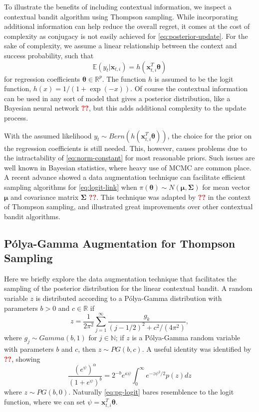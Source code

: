 \documentclass[12pt]{article}
\newcommand{\bred}[1]{\textbf{\textcolor{red}{#1}}}
\begin{document}
To illustrate the benefits of including contextual information, we inspect a 
contextual bandit algorithm using Thompson sampling.
While incorporating additional information can help reduce the overall regret, 
it comes at the cost of complexity as conjugacy is not easily achieved for 
\eqref{eq:posterior-update}.
For the sake of complexity, we assume a linear relationship between the context 
and success probability, such that
\begin{equation}
\mathbb{E}(y_t \vert \bm{x}_{t,i}) = h(\bm{x}_{t,i}^T \bm{\theta})
\label{eq:logit-link}
\end{equation}
for regression coefficients $\bm{\theta} \in \mathbb{R}^p$. 
The function $h$ is assumed to be the logit function, 
$h(x) = 1 / (1 + \exp(-x))$.
Of course the contextual information can be used in any sort of model that gives a
posterior distribution, like a Bayesian neural network \bred{??}, but this adds 
additional complexity to the update process.

With the assumed likelihood $y_t \sim Bern(h(\bm{x}_{t,i}^T \bm{\theta}))$, the
choice for the prior on the regression coefficients is still needed.
This, however, causes problems due to the intractability of \eqref{eq:norm-constant}
for most reasonable priors.
Such issues are well known in Bayesian statistics, where heavy use of MCMC are 
common place.
A recent advance showed a data augmentation technique can facilitate efficient
sampling algorithms for \eqref{eq:logit-link} when 
$\pi(\bm{\theta}) \sim N(\bm{\mu}, \bm{\Sigma})$ 
for mean vector $\bm{\mu}$ and covariance matrix $\bm{\Sigma}$ \bred{??}.
This technique was adapted by \bred{??} in the context of Thompson sampling, 
and illustrated great improvements over other contextual bandit algorithms.

\subsection{P\'olya-Gamma Augmentation for Thompson Sampling}

Here we briefly explore the data augmentation technique that facilitates the 
sampling of the posterior distribution for the linear contextual bandit.
A random variable $z$ is distributed according to a P\'olya-Gamma distribution
with parameters $b > 0$ and $c \in \mathbb{R}$ if 
\begin{equation}
z = \frac{1}{2\pi^2} \sum_{j = 1}^\infty \frac{g_k}{(j - 1/2)^2 + c^2/(4\pi^2)},
\end{equation}
where 
$g_j \sim Gamma(b,1)$ 
for $j \in \mathbb{N}$; if $z$ is a P\'olya-Gamma random variable with parameters
$b$ and $c$, then $z \sim PG(b,c)$. 
A useful identity was identified by \bred{??}, showing
\begin{equation}
\frac{(e^\psi)^\alpha}{(1 + e^\psi)^b}
= 2^{-b}e^{\kappa\psi}
\int_0^\infty e^{-z\psi^2 / 2} p(z) dz
\label{eq:pg-logit}
\end{equation}
where $z \sim PG(b,0)$.
Naturally \eqref{eq:pg-logit} bares resemblence to the logit function, where we
can set $\psi = \bm{x}_{t,i}^T\bm{\theta}$.
\end{document}
